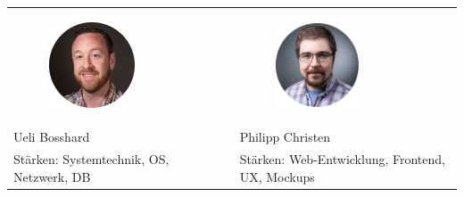 \begin{tabularx}{\textwidth}{| X | X | }
    \hline
    \begin{minipage}{.5\textwidth}
        \begin{figure}[H]
            \centering
            \includegraphics[width=0.6\textwidth,keepaspectratio]{fig/ubos}
            \label{fig:authors:ubos}
        \end{figure}
    \end{minipage}
	&
	\begin{minipage}{.5\textwidth}
        \begin{figure}[H]
            \centering
            \includegraphics[width=0.6\textwidth,keepaspectratio]{fig/pchr}
            \label{fig:authors:pchr}
        \end{figure}
    \end{minipage} \\
    Ueli Bosshard & Philipp Christen \\
    Stärken: Systemtechnik, OS, Netzwerk, DB
    &
    Stärken: Web-Entwicklung, Frontend, UX, Mockups \\
    \hline
\end{tabularx}

